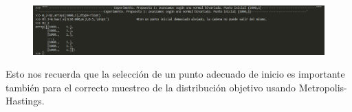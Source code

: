 \documentclass[letterpaper]{article}
\newcommand{\1}{\mathds{1}}
\theoremstyle{definition}
\theoremstyle{definition}
\theoremstyle{definition}
\theoremstyle{definition}
\theoremstyle{definition}
\begin{document}
    \begin{figure}[h!]
        \centering
        \includegraphics[width=\linewidth]{31.png}
        \caption{}
    \end{figure} 
    Esto nos recuerda que la selección de un punto adecuado de inicio es importante también para el correcto muestreo de la distribución 
    objetivo usando Metropolis-Hastings.
\end{document}
